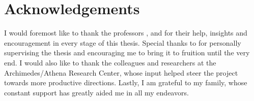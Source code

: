 %
\chapter*{Acknowledgements}
\label{sec:acknowledgements}
\vspace*{-10mm}

I would foremost like to thank the professors \thesisSupervisor, \thesisReviewerOne and \thesisReviewerTwo for their help, insights and encouragement in every stage of this thesis. Special thanks to \thesisSupervisorTitle \thesisSupervisor for personally supervising the thesis and encouraging me to bring it to fruition until the very end. I would also like to thank the colleagues and researchers at the Archimedes/Athena Research Center, whose input helped steer the project towards more productive directions. Lastly, I am grateful to my family, whose constant support has greatly aided me in all my endeavors. 